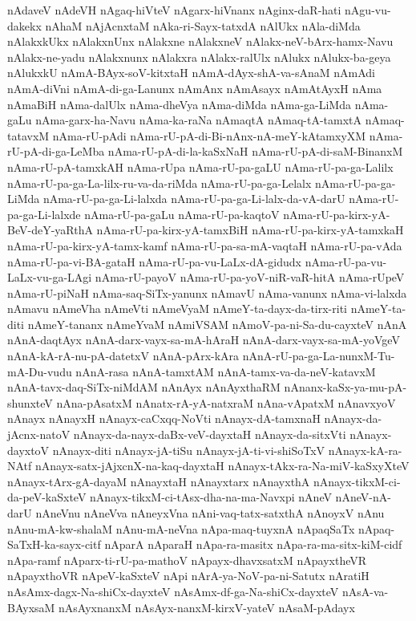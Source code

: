 {nAdaveV
nAdeVH
nAgaq-hiVteV
nAgarx-hiVnanx
nAginx-daR-hati
nAgu-vu-dakekx
nAhaM
nAjAcnxtaM
nAka-ri-Sayx-tatxdA
nAlUkx
nAla-diMda
nAlakxkUkx
nAlakxnUnx
nAlakxne
nAlakxneV
nAlakx-neV-bArx-hamx-Navu
nAlakx-ne-yadu
nAlakxnunx
nAlakxra
nAlakx-ralUlx
nAlukx
nAlukx-ba-geya
nAlukxkU
nAmA-BAyx-soV-kitxtaH
nAmA-dAyx-shA-va-sAnaM
nAmAdi
nAmA-diVni
nAmA-di-ga-Lanunx
nAmAnx
nAmAsayx
nAmAtAyxH
nAma
nAmaBiH
nAma-dalUlx
nAma-dheVya
nAma-diMda
nAma-ga-LiMda
nAma-gaLu
nAma-garx-ha-Navu
nAma-ka-raNa
nAmaqtA
nAmaq-tA-tamxtA
nAmaq-tatavxM
nAma-rU-pAdi
nAma-rU-pA-di-Bi-nAnx-nA-meY-kAtamxyXM
nAma-rU-pA-di-ga-LeMba
nAma-rU-pA-di-la-kaSxNaH
nAma-rU-pA-di-saM-BinanxM
nAma-rU-pA-tamxkAH
nAma-rUpa
nAma-rU-pa-gaLU
nAma-rU-pa-ga-Lalilx
nAma-rU-pa-ga-La-lilx-ru-va-da-riMda
nAma-rU-pa-ga-Lelalx
nAma-rU-pa-ga-LiMda
nAma-rU-pa-ga-Li-lalxda
nAma-rU-pa-ga-Li-lalx-da-vA-darU
nAma-rU-pa-ga-Li-lalxde
nAma-rU-pa-gaLu
nAma-rU-pa-kaqtoV
nAma-rU-pa-kirx-yA-BeV-deY-yaRthA
nAma-rU-pa-kirx-yA-tamxBiH
nAma-rU-pa-kirx-yA-tamxkaH
nAma-rU-pa-kirx-yA-tamx-kamf
nAma-rU-pa-sa-mA-vaqtaH
nAma-rU-pa-vAda
nAma-rU-pa-vi-BA-gataH
nAma-rU-pa-vu-LaLx-dA-gidudx
nAma-rU-pa-vu-LaLx-vu-ga-LAgi
nAma-rU-payoV
nAma-rU-pa-yoV-niR-vaR-hitA
nAma-rUpeV
nAma-rU-piNaH
nAma-saq-SiTx-yanunx
nAmavU
nAma-vanunx
nAma-vi-lalxda
nAmavu
nAmeVha
nAmeVti
nAmeVyaM
nAmeY-ta-dayx-da-tirx-riti
nAmeY-ta-diti
nAmeY-tananx
nAmeYvaM
nAmiVSAM
nAmoV-pa-ni-Sa-du-cayxteV
nAnA
nAnA-daqtAyx
nAnA-darx-vayx-sa-mA-hAraH
nAnA-darx-vayx-sa-mA-yoVgeV
nAnA-kA-rA-nu-pA-datetxV
nAnA-pArx-kAra
nAnA-rU-pa-ga-La-nunxM-Tu-mA-Du-vudu
nAnA-rasa
nAnA-tamxtAM
nAnA-tamx-va-da-neV-katavxM
nAnA-tavx-daq-SiTx-niMdAM
nAnAyx
nAnAyxthaRM
nAnanx-kaSx-ya-mu-pA-shunxteV
nAna-pAsatxM
nAnatx-rA-yA-natxraM
nAna-vApatxM
nAnavxyoV
nAnayx
nAnayxH
nAnayx-caCxqq-NoVti
nAnayx-dA-tamxnaH
nAnayx-da-jAcnx-natoV
nAnayx-da-nayx-daBx-veV-dayxtaH
nAnayx-da-sitxVti
nAnayx-dayxtoV
nAnayx-diti
nAnayx-jA-tiSu
nAnayx-jA-ti-vi-shiSoTxV
nAnayx-kA-ra-NAtf
nAnayx-satx-jAjxcnX-na-kaq-dayxtaH
nAnayx-tAkx-ra-Na-miV-kaSxyXteV
nAnayx-tArx-gA-dayaM
nAnayxtaH
nAnayxtarx
nAnayxthA
nAnayx-tikxM-ci-da-peV-kaSxteV
nAnayx-tikxM-ci-tAsx-dha-na-ma-Navxpi
nAneV
nAneV-nA-darU
nAneVnu
nAneVva
nAneyxVna
nAni-vaq-tatx-satxthA
nAnoyxV
nAnu
nAnu-mA-kw-shalaM
nAnu-mA-neVna
nApa-maq-tuyxnA
nApaqSaTx
nApaq-SaTxH-ka-sayx-citf
nAparA
nAparaH
nApa-ra-masitx
nApa-ra-ma-sitx-kiM-cidf
nApa-ramf
nAparx-ti-rU-pa-mathoV
nApayx-dhavxsatxM
nApayxtheVR
nApayxthoVR
nApeV-kaSxteV
nApi
nArA-ya-NoV-pa-ni-Satutx
nAratiH
nAsAmx-dagx-Na-shiCx-dayxteV
nAsAmx-df-ga-Na-shiCx-dayxteV
nAsA-va-BAyxsaM
nAsAyxnanxM
nAsAyx-nanxM-kirxV-yateV
nAsaM-pAdayx
}
